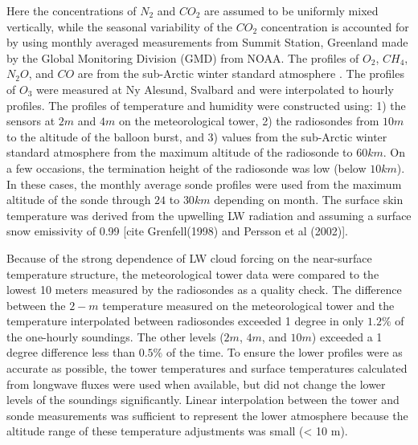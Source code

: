 Here the concentrations of $N_{2}$ and $CO_{2}$ are assumed to be uniformly mixed vertically, while the seasonal variability of the $CO_{2}$ concentration is accounted for by using monthly averaged measurements from Summit Station, Greenland made by the Global Monitoring Division (GMD) from NOAA. The profiles of $O_{2}$, $CH_{4}$, $N_{2}O$, and $CO$ are from the sub-Arctic winter standard atmosphere \cite{mcclatchey:1972}. The profiles of $O_{3}$ were measured at Ny Alesund, Svalbard and were interpolated to hourly profiles. The profiles of temperature and humidity were constructed using: 1) the sensors at $2 m$ and $4 m$ on the meteorological tower, 2) the radiosondes from $10 m$ to the altitude of the balloon burst, and 3) values from the sub-Arctic winter standard atmosphere from the maximum altitude of the radiosonde to $60 km$. On a few occasions, the termination height of the radiosonde was low (below $10 km$). In these cases, the monthly average sonde profiles were used from the maximum altitude of the sonde through $24$ to $30 km$ depending on month. The surface skin temperature was derived from the upwelling LW radiation \cite{walden:2017} and assuming a surface snow emissivity of 0.99 [cite Grenfell(1998) and Persson et al (2002)].

Because of the strong dependence of LW cloud forcing on the near-surface temperature structure, the meteorological tower data were compared to the lowest 10 meters measured by the radiosondes as a quality check. The difference between the $2-m$ temperature measured on the meteorological tower and the temperature interpolated between radiosondes exceeded 1 degree in only $1.2 \%$ of the one-hourly soundings. The other levels ($2 m$, $4 m$, and $10 m$) exceeded a 1 degree difference less than $0.5 \%$ of the time. To ensure the lower profiles were as accurate as possible, the tower temperatures and surface temperatures calculated from longwave fluxes were used when available, but did not change the lower levels of the soundings significantly. Linear interpolation between the tower and sonde measurements was sufficient to represent the lower atmosphere because the altitude range of these temperature adjustments was small (< 10 m).

